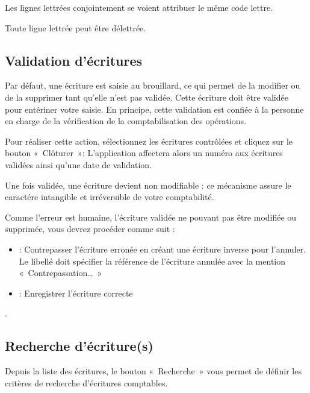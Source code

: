 \documentclass[a4paper,10pt,oneside,french]{sphinxmanual}
\begin{document}
\sphinxAtStartPar
Les lignes lettrées conjointement se voient attribuer le même code lettre.

\sphinxAtStartPar
Toute ligne lettrée peut être délettrée.


\subsection{Validation d’écritures}
\label{\detokenize{accounting/entity:validation-d-ecritures}}
\sphinxAtStartPar
Par défaut, une écriture est saisie au brouillard, ce qui permet de la modifier ou de la supprimer tant qu’elle n’est pas validée.
Cette écriture doit être validée pour entériner votre saisie. En principe, cette validation est confiée à la personne en charge de la vérification de la comptabilisation des opérations.

\sphinxAtStartPar
Pour réaliser cette action, sélectionnez les écritures contrôlées et cliquez sur le bouton « Clôturer »: L’application affectera alors un numéro aux écritures validées ainsi qu’une date de validation.

\sphinxAtStartPar
Une fois validée, une écriture devient non modifiable : ce mécanisme assure le caractére intangible et irréversible de votre comptabilité.

\sphinxAtStartPar
Comme l’erreur est humaine, l’écriture validée ne pouvant pas être modifiée ou supprimée, vous devrez procéder comme suit :
\begin{itemize}
\item {} 
 : Contrepasser l’écriture erronée en créant une écriture inverse pour l’annuler. Le libellé doit spécifier la référence de l’écriture annulée avec la mention « Contrepassation… »

\item {} 
 : Enregistrer l’écriture correcte

\end{itemize}

\sphinxAtStartPar
{}.


\subsection{Recherche d’écriture(s)}
\label{\detokenize{accounting/entity:recherche-d-ecriture-s}}
\sphinxAtStartPar
Depuis la liste des écritures, le bouton « Recherche » vous permet de définir les critères de recherche d’écritures comptables.
\begin{quote}

\noindent{}
\end{quote}
\end{document}
